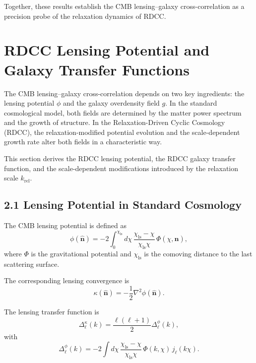 \documentclass[11pt,a4paper]{article}
\begin{document}
Together, these results establish the CMB lensing–galaxy cross-correlation as a precision 
probe of the relaxation dynamics of RDCC.

\section{RDCC Lensing Potential and Galaxy Transfer Functions}

The CMB lensing–galaxy cross-correlation depends on two key ingredients: the lensing 
potential $\phi$ and the galaxy overdensity field $g$. In the standard cosmological model, 
both fields are determined by the matter power spectrum and the growth of structure. In the 
Relaxation-Driven Cyclic Cosmology (RDCC), the relaxation-modified potential evolution and 
the scale-dependent growth rate alter both fields in a characteristic way.

This section derives the RDCC lensing potential, the RDCC galaxy transfer function, and the 
scale-dependent modifications introduced by the relaxation scale $k_{\mathrm{rel}}$.

\subsection*{2.1 Lensing Potential in Standard Cosmology}

The CMB lensing potential is defined as
\begin{equation}
    \phi(\hat{\mathbf{n}})
    = -2 \int_{0}^{\chi_{\mathrm{ls}}} d\chi\,
      \frac{\chi_{\mathrm{ls}}-\chi}{\chi_{\mathrm{ls}}\chi}\,
      \Phi(\chi,\hat{\mathbf{n}}),
\end{equation}
where $\Phi$ is the gravitational potential and $\chi_{\mathrm{ls}}$ is the comoving 
distance to the last scattering surface.

The corresponding lensing convergence is
\begin{equation}
    \kappa(\hat{\mathbf{n}})
    = -\frac{1}{2}\nabla^{2}\phi(\hat{\mathbf{n}}).
\end{equation}

The lensing transfer function is
\begin{equation}
    \Delta_{\ell}^{\kappa}(k)
    = \frac{\ell(\ell+1)}{2}
      \Delta_{\ell}^{\phi}(k),
\end{equation}
with
\begin{equation}
    \Delta_{\ell}^{\phi}(k)
    = -2 \int d\chi\,
      \frac{\chi_{\mathrm{ls}}-\chi}{\chi_{\mathrm{ls}}\chi}\,
      \Phi(k,\chi)\,
      j_{\ell}(k\chi).
\end{equation}
\end{document}

